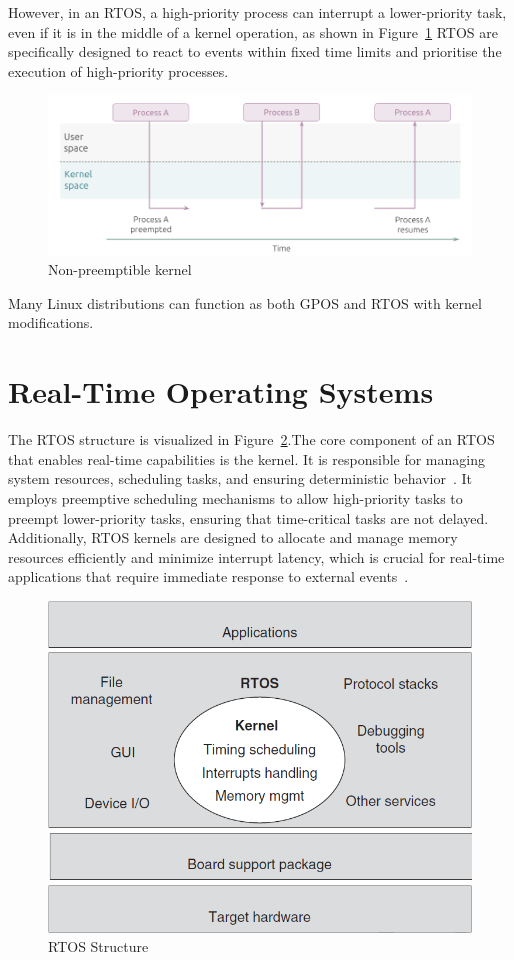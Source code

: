 \documentclass[MMR,Master,english]{twbook}
\begin{document}
\noindent However, in an RTOS, a high-priority process can interrupt a lower-priority task, even if it is in the middle of a kernel operation, as shown in Figure~\ref{fig:kernel_rt} RTOS are specifically designed to react to events within fixed time limits and prioritise the execution of high-priority processes.

\begin{figure}[H]
	\centering
	\includegraphics[width=0.75\columnwidth]{img/introduction/kernel_rt.png}
	\caption[Non-preemptible kernel]{Non-preemptible kernel~\cite{WhatRealtimeLinuxa}}
	\label{fig:kernel_rt}
\end{figure}

\noindent Many Linux distributions can function as both GPOS and RTOS with kernel modifications.

\section{Real-Time Operating Systems}
\noindent The RTOS structure is visualized in Figure~\ref{fig:rtos_structure}.The core component of an RTOS that enables real-time capabilities is the kernel. It is responsible for managing system resources, scheduling tasks, and ensuring deterministic behavior~\cite{malallahComprehensiveStudyKernel2021}. It employs preemptive scheduling mechanisms to allow high-priority tasks to preempt lower-priority tasks, ensuring that time-critical tasks are not delayed. Additionally, RTOS kernels are designed to allocate and manage memory resources efficiently and minimize interrupt latency, which is crucial for real-time applications that require immediate response to external events~\cite{wangRealtimeEmbeddedSystems2017}.

\begin{figure}[H]
	\centering
	\includegraphics[width=0.50\columnwidth]{img/introduction/rtos_structure.png}
	\caption[RTOS Structure]{RTOS Structure~\cite{wangRealtimeEmbeddedSystems2017}}
	\label{fig:rtos_structure}
\end{figure}
\end{document}
